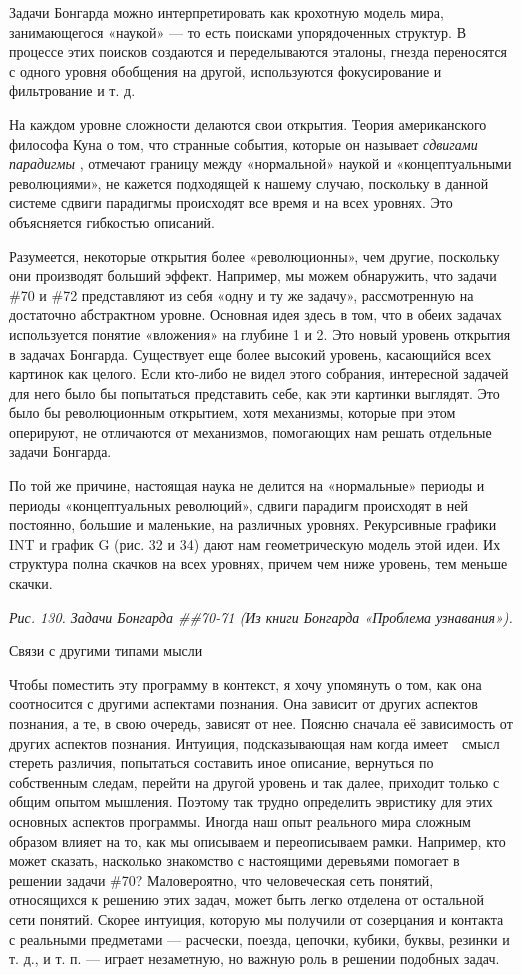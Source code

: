 \documentclass[../main.tex]{subfiles}
\begin{document}
Задачи Бонгарда можно интерпретировать как крохотную модель мира, занимающегося «наукой» --- то есть поисками упорядоченных структур. В процессе этих поисков создаются и переделываются эталоны, гнезда переносятся с одного уровня обобщения на другой, используются фокусирование и фильтрование и т. д.

На каждом уровне сложности делаются свои открытия. Теория американского философа Куна о том, что странные события, которые он называет \emph{сдвигами парадигмы} , отмечают границу между «нормальной» наукой и «концептуальными революциями», не кажется подходящей к нашему случаю, поскольку в данной системе сдвиги парадигмы происходят все время и на всех уровнях. Это объясняется гибкостью описаний.

Разумеется, некоторые открытия более «революционны», чем другие, поскольку они производят больший эффект. Например, мы можем обнаружить, что задачи \#70 и \#72 представляют из себя «одну и ту же задачу», рассмотренную на достаточно абстрактном уровне. Основная идея здесь в том, что в обеих задачах используется понятие «вложения» на глубине 1 и 2. Это новый уровень открытия в задачах Бонгарда. Существует еще более высокий уровень, касающийся всех картинок как целого. Если кто-либо не видел этого собрания, интересной задачей для него было бы попытаться представить себе, как эти картинки выглядят. Это было бы революционным открытием, хотя механизмы, которые при этом оперируют, не отличаются от механизмов, помогающих нам решать отдельные задачи Бонгарда.

По той же причине, настоящая наука не делится на «нормальные» периоды и периоды «концептуальных революций», сдвиги парадигм происходят в ней постоянно, большие и маленькие, на различных уровнях. Рекурсивные графики INT и график G (рис. 32 и 34) дают нам геометрическую модель этой идеи. Их структура полна скачков на всех уровнях, причем чем ниже уровень, тем меньше скачки.

\emph{Рис. 130. Задачи Бонгарда \#\#70-71 (Из книги Бонгарда «Проблема узнавания»).}

Связи с другими типами мысли

Чтобы поместить эту программу в контекст, я хочу упомянуть о том, как она соотносится с другими аспектами познания. Она зависит от других аспектов познания, а те, в свою очередь, зависят от нее. Поясню сначала её зависимость от других аспектов познания. Интуиция, подсказывающая нам когда имеет~~смысл стереть различия, попытаться составить иное описание, вернуться по собственным следам, перейти на другой уровень и так далее, приходит только с общим опытом мышления. Поэтому так трудно определить эвристику для этих основных аспектов программы. Иногда наш опыт реального мира сложным образом влияет на то, как мы описываем и переописываем рамки. Например, кто может сказать, насколько знакомство с настоящими деревьями помогает в решении задачи \#70? Маловероятно, что человеческая сеть понятий, относящихся к решению этих задач, может быть легко отделена от остальной сети понятий. Скорее интуиция, которую мы получили от созерцания и контакта с реальными предметами --- расчески, поезда, цепочки, кубики, буквы, резинки и т. д., и т. п. --- играет незаметную, но важную роль в решении подобных задач.
\end{document}
